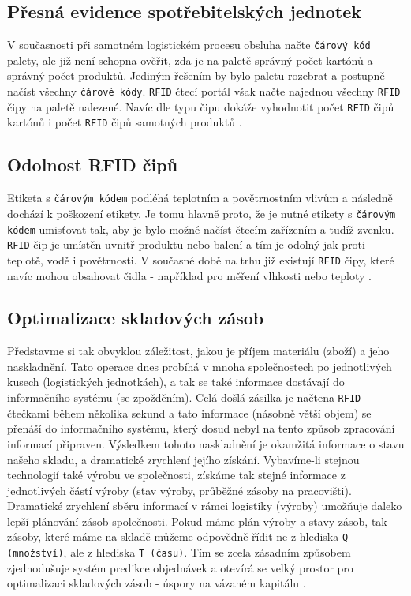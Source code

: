 \documentclass[czech,BP]{thesiskiv}
\begin{document}
\subsection{Přesná evidence spotřebitelských jednotek}
V současnosti při samotném logistickém procesu obsluha načte \texttt{čárový kód} palety, ale již není schopna ověřit, zda je na paletě správný počet kartónů a správný počet produktů. Jediným řešením by bylo paletu rozebrat a postupně načíst všechny \texttt{čárové kódy}. \texttt{RFID} čtecí portál však načte najednou všechny \texttt{RFID} čipy na paletě nalezené. Navíc dle typu čipu dokáže vyhodnotit počet \texttt{RFID} čipů kartónů i počet \texttt{RFID} čipů samotných produktů \cite{dolevcek2010identifikace}.

\subsection{Odolnost RFID čipů}
Etiketa s \texttt{čárovým kódem} podléhá teplotním a povětrnostním vlivům a následně dochází k poškození etikety. Je tomu hlavně proto, že je nutné etikety s \texttt{čárovým kódem} umisťovat tak, aby je bylo možné načíst čtecím zařízením a tudíž zvenku. \texttt{RFID} čip je umístěn uvnitř produktu nebo balení a tím je odolný jak proti teplotě, vodě i povětrnosti. V současné době na trhu již existují \texttt{RFID} čipy, které navíc mohou obsahovat čidla - například pro měření vlhkosti nebo teploty \cite{dolevcek2010identifikace}.

\subsection{Optimalizace skladových zásob}
Představme si tak obvyklou záležitost, jakou je příjem materiálu (zboží) a jeho naskladnění. Tato operace dnes probíhá v mnoha společnostech po jednotlivých kusech (logistických jednotkách), a tak se také informace dostávají do informačního systému (se zpožděním). Celá došlá zásilka je načtena \texttt{RFID} čtečkami během několika sekund a tato informace (násobně větší objem) se přenáší do informačního systému, který dosud nebyl na tento způsob zpracování informací připraven. Výsledkem tohoto naskladnění je okamžitá informace o stavu našeho skladu, a dramatické zrychlení jejího získání. Vybavíme-li stejnou technologií také výrobu ve společnosti, získáme tak stejné informace z jednotlivých částí výroby (stav výroby, průběžné zásoby na pracovišti). Dramatické zrychlení sběru informací v rámci logistiky (výroby) umožňuje daleko lepší plánování zásob společnosti. Pokud máme plán výroby a stavy zásob, tak zásoby, které máme na skladě můžeme odpovědně řídit ne z hlediska \texttt{Q (množství)}, ale z hlediska \texttt{T (času)}. Tím se zcela zásadním způsobem zjednodušuje systém predikce objednávek a otevírá se velký prostor pro optimalizaci skladových zásob - úspory na vázaném kapitálu \cite{dolevcek2010identifikace}.
\end{document}
